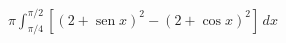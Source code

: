 \item $\displaystyle \pi \int_{\pi/4}^{\pi/2} [(2 + \operatorname{sen} x)^2 - (2 + \cos x)^2] \, dx$
